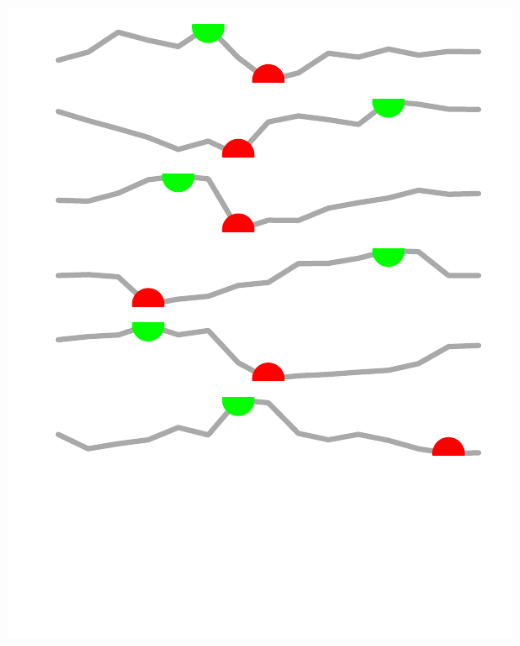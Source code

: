 \documentclass{article}\usepackage[]{graphicx}\usepackage[]{color}
\makeatletter
\def\maxwidth{ %
  \ifdim\Gin@nat@width>\linewidth
    \linewidth
  \else
    \Gin@nat@width
  \fi
}
\makeatother
\begin{document}
\begin{minipage}[b]{0.99\textwidth}
\begin{minipage}[t]{0.99\textwidth}
\begin{minipage}[c]{0.875\textwidth}
{      }
    \end{minipage}
    \begin{minipage}[c]{0.11\textwidth}
      \vspace*{+0.8cm}


{\centering \includegraphics[width=\maxwidth]{figure/createSparklines_macro-1} 

}



      \vspace*{-0.5cm}
    \end{minipage}
    

\end{minipage}
\end{minipage}
\end{document}
